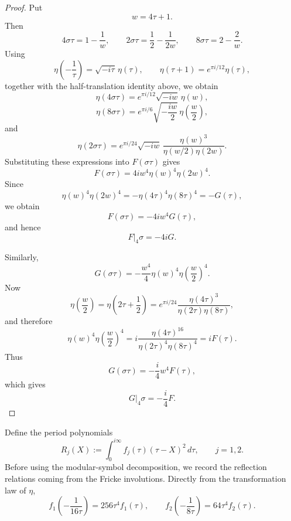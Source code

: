 \documentclass[preprint,12pt]{elsarticle}
\theoremstyle{definition}
\theoremstyle{remark}
\begin{document}
	\begin{proof}
		Put
		\[
		w=4\tau+1.
		\]
		Then
		\[
		4\sigma\tau=1-\frac1w,\qquad
		2\sigma\tau=\frac12-\frac{1}{2w},\qquad
		8\sigma\tau=2-\frac{2}{w}.
		\]
		Using
		\[
		\eta\left(-\frac1\tau\right)=\sqrt{-i\tau}\,\eta(\tau),
		\qquad
		\eta(\tau+1)=e^{\pi i/12}\eta(\tau),
		\]
		together with the half-translation identity above, we obtain
		\[
		\eta(4\sigma\tau)
		=
		e^{\pi i/12}\sqrt{-iw}\,\eta(w),
		\]
		\[
		\eta(8\sigma\tau)
		=
		e^{\pi i/6}\sqrt{-\frac{iw}{2}}\,\eta\left(\frac w2\right),
		\]
		and
		\[
		\eta(2\sigma\tau)
		=
		e^{\pi i/24}\sqrt{-iw}\,
		\frac{\eta(w)^3}{\eta(w/2)\eta(2w)}.
		\]
		Substituting these expressions into $F(\sigma\tau)$ gives
		\[
		F(\sigma\tau)
		=
		4iw^4\eta(w)^4\eta(2w)^4.
		\]
		Since
		\[
		\eta(w)^4\eta(2w)^4
		=
		-\eta(4\tau)^4\eta(8\tau)^4
		=
		-G(\tau),
		\]
		we obtain
		\[
		F(\sigma\tau)=-4iw^4G(\tau),
		\]
		and hence
		\[
		F|_4\sigma=-4iG.
		\]
		
		Similarly,
		\[
		G(\sigma\tau)
		=
		-\frac{w^4}{4}\eta(w)^4\eta\left(\frac w2\right)^4.
		\]
		Now
		\[
		\eta\left(\frac w2\right)
		=
		\eta\left(2\tau+\frac12\right)
		=
		e^{\pi i/24}
		\frac{\eta(4\tau)^3}{\eta(2\tau)\eta(8\tau)},
		\]
		and therefore
		\[
		\eta(w)^4\eta\left(\frac w2\right)^4
		=
		i\frac{\eta(4\tau)^{16}}{\eta(2\tau)^4\eta(8\tau)^4}
		=
		iF(\tau).
		\]
		Thus
		\[
		G(\sigma\tau)
		=
		-\frac{i}{4}w^4F(\tau),
		\]
		which gives
		\[
		G|_4\sigma=-\frac{i}{4}F.
		\]
	\end{proof}
	
	Define the period polynomials
	\[
	R_j(X):=\int_0^{i\infty}f_j(\tau)(\tau-X)^2\,d\tau,
	\qquad j=1,2.
	\]
	Before using the modular-symbol decomposition, we record the reflection relations coming from the Fricke involutions.  Directly from the transformation law of $\eta$,
	\[
	f_1\left(-\frac{1}{16\tau}\right)=256\tau^4f_1(\tau),
	\qquad
	f_2\left(-\frac{1}{8\tau}\right)=64\tau^4f_2(\tau).
	\]
	
	
	
\end{document}

